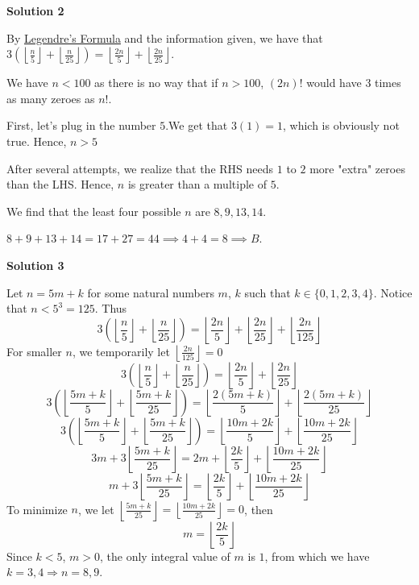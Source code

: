 \begin{enumerate}
\textbf{Solution 2}

By \href{https://artofproblemsolving.com/wiki/index.php?title=Legendre\%27s\_Formula}{Legendre's Formula} and the information given, we have that $3\left(\left\lfloor{\frac{n}{5}}\right\rfloor+\left\lfloor{\frac{n}{25}}\right\rfloor\right)=\left\lfloor{\frac{2n}{5}}\right\rfloor+\left\lfloor{\frac{2n}{25}}\right\rfloor$.

 We have $n<100$ as there is no way that if $n>100$, $(2n)!$ would have $3$ times as many zeroes as $n!$.

 First, let's plug in the number $5$.We get that $3(1)=1$, which is obviously not true. Hence, $n>5$

 After several attempts, we realize that the RHS needs $1$ to $2$ more "extra" zeroes than the LHS. Hence, $n$ is greater than a multiple of $5$.

 We find that the least four possible $n$ are $8,9,13,14$.

 $8+9+13+14=17+27=44\implies 4+4=8\implies\boxed{B}$.

 



\textbf{Solution 3}

Let $n=5m+k$ for some natural numbers $m$, $k$ such that $k\in\{0,1,2,3,4\}$. Notice that $n<5^3=125$. Thus 
 \[3(\left\lfloor\frac{n}{5}\right\rfloor+\left\lfloor\frac{n}{25}\right\rfloor)=\left\lfloor\frac{2n}{5}\right\rfloor+\left\lfloor\frac{2n}{25}\right\rfloor+\left\lfloor\frac{2n}{125}\right\rfloor\]For smaller $n$, we temporarily let $\left\lfloor\frac{2n}{125}\right\rfloor=0$
 \[3(\left\lfloor\frac{n}{5}\right\rfloor+\left\lfloor\frac{n}{25}\right\rfloor)=\left\lfloor\frac{2n}{5}\right\rfloor+\left\lfloor\frac{2n}{25}\right\rfloor\]
 \[3(\left\lfloor\frac{5m+k}{5}\right\rfloor+\left\lfloor\frac{5m+k}{25}\right\rfloor)=\left\lfloor\frac{2(5m+k)}{5}\right\rfloor+\left\lfloor\frac{2(5m+k)}{25}\right\rfloor\]
 \[3(\left\lfloor\frac{5m+k}{5}\right\rfloor+\left\lfloor\frac{5m+k}{25}\right\rfloor)=\left\lfloor\frac{10m+2k}{5}\right\rfloor+\left\lfloor\frac{10m+2k}{25}\right\rfloor\]
 \[3m+3\left\lfloor\frac{5m+k}{25}\right\rfloor=2m+\left\lfloor\frac{2k}{5}\right\rfloor+\left\lfloor\frac{10m+2k}{25}\right\rfloor\]
 \[m+3\left\lfloor\frac{5m+k}{25}\right\rfloor=\left\lfloor\frac{2k}{5}\right\rfloor+\left\lfloor\frac{10m+2k}{25}\right\rfloor\]To minimize $n$, we let $\left\lfloor\frac{5m+k}{25}\right\rfloor=\left\lfloor\frac{10m+2k}{25}\right\rfloor=0$, then
 \[m=\left\lfloor\frac{2k}{5}\right\rfloor\]Since $k<5$, $m>0$, the only integral value of $m$ is $1$, from which we have $k=3,4\Longrightarrow n=8,9$.


\end{enumerate}
